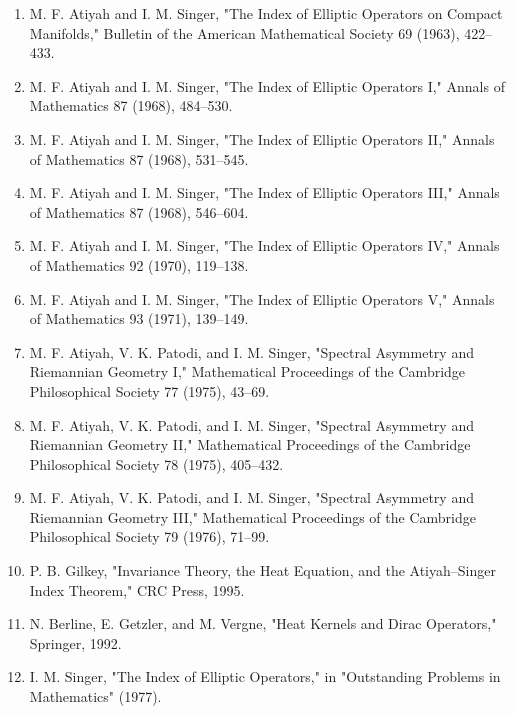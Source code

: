 \begin{enumerate}
\item M. F. Atiyah and I. M. Singer, "The Index of Elliptic Operators on Compact Manifolds," Bulletin of the American Mathematical Society 69 (1963), 422--433.
\item M. F. Atiyah and I. M. Singer, "The Index of Elliptic Operators I," Annals of Mathematics 87 (1968), 484--530.
\item M. F. Atiyah and I. M. Singer, "The Index of Elliptic Operators II," Annals of Mathematics 87 (1968), 531--545.
\item M. F. Atiyah and I. M. Singer, "The Index of Elliptic Operators III," Annals of Mathematics 87 (1968), 546--604.
\item M. F. Atiyah and I. M. Singer, "The Index of Elliptic Operators IV," Annals of Mathematics 92 (1970), 119--138.
\item M. F. Atiyah and I. M. Singer, "The Index of Elliptic Operators V," Annals of Mathematics 93 (1971), 139--149.
\item M. F. Atiyah, V. K. Patodi, and I. M. Singer, "Spectral Asymmetry and Riemannian Geometry I," Mathematical Proceedings of the Cambridge Philosophical Society 77 (1975), 43--69.
\item M. F. Atiyah, V. K. Patodi, and I. M. Singer, "Spectral Asymmetry and Riemannian Geometry II," Mathematical Proceedings of the Cambridge Philosophical Society 78 (1975), 405--432.
\item M. F. Atiyah, V. K. Patodi, and I. M. Singer, "Spectral Asymmetry and Riemannian Geometry III," Mathematical Proceedings of the Cambridge Philosophical Society 79 (1976), 71--99.
\item P. B. Gilkey, "Invariance Theory, the Heat Equation, and the Atiyah--Singer Index Theorem," CRC Press, 1995.
\item N. Berline, E. Getzler, and M. Vergne, "Heat Kernels and Dirac Operators," Springer, 1992.
\item I. M. Singer, "The Index of Elliptic Operators," in "Outstanding Problems in Mathematics" (1977).
\end{enumerate}
